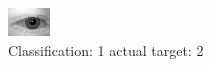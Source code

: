 \begin{figure}[h!]
\begin{center}
\includegraphics[width=0.60\columnwidth]{figures/ID508_class_1_target_2.png}
\end{center}
\caption{ Classification: 1 actual target: 2}
\label{fig:ID508_class_1_target_2}
\end{figure}

